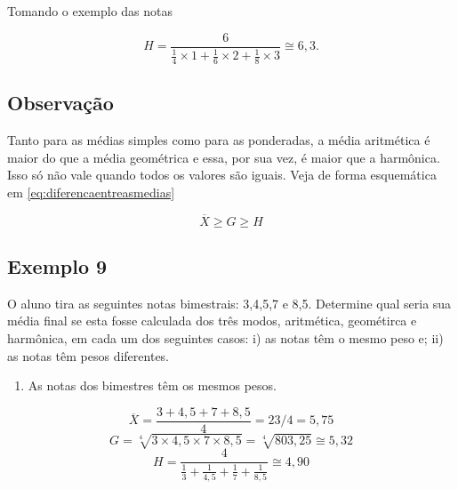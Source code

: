 \documentclass[
]{book}
\providecommand{\tightlist}{%
  \setlength{\itemsep}{0pt}\setlength{\parskip}{0pt}}
\begin{document}
Tomando o exemplo das notas

\begin{equation*}
    H = \frac{6}{\frac{1}{4}\times 1 + \frac{1}{6}\times 2 + \frac{1}{8}\times 3}\cong 6,3.
\end{equation*}

\hypertarget{observauxe7uxe3o}{%
\subsection{Observação}\label{observauxe7uxe3o}}

Tanto para as médias simples como para as ponderadas, a
média aritmética é maior do que a média geométrica e essa, por sua vez, é maior
que a harmônica. Isso só não vale quando todos os valores são iguais. Veja de forma esquemática em \eqref{eq:diferencaentreasmedias}

\begin{equation}
  \overline{X} \geq G \geq H
  \label{eq:diferencaentreasmedias}
\end{equation}

\hypertarget{exemplo-9}{%
\subsection{Exemplo 9}\label{exemplo-9}}

O aluno tira as seguintes notas bimestrais: 3,4,5,7 e 8,5. Determine qual seria sua média final se esta fosse calculada dos três modos, aritmética, geométirca e harmônica, em cada um dos seguintes casos: i) as notas têm o mesmo peso e; ii) as notas têm pesos diferentes.

\begin{enumerate}
\def\labelenumi{\roman{enumi})}
\tightlist
\item
  As notas dos bimestres têm os mesmos pesos.
\end{enumerate}

\begin{equation*}
    \overline{X} = \frac{3 + 4,5 + 7 + 8,5}{4} = 23/4 = 5,75
  \end{equation*}
\begin{equation*}
    G = \sqrt[4]{3 \times 4,5 \times 7 \times 8,5} = \sqrt[4]{803,25} \cong 5,32
  \end{equation*}
\begin{equation*}
    H = \frac{4}{\frac{1}{3} +\frac{1}{4,5} +\frac{1}{7} +\frac{1}{8,5}}   \cong 4,90
  \end{equation*}
\end{document}

